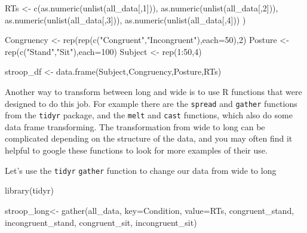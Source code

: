 \documentclass[
]{book}
\newenvironment{Shaded}{\begin{snugshade}}{\end{snugshade}}
\newcommand{\AttributeTok}[1]{\textcolor[rgb]{0.77,0.63,0.00}{#1}}
\newcommand{\DecValTok}[1]{\textcolor[rgb]{0.00,0.00,0.81}{#1}}
\newcommand{\FunctionTok}[1]{\textcolor[rgb]{0.00,0.00,0.00}{#1}}
\newcommand{\NormalTok}[1]{#1}
\newcommand{\OtherTok}[1]{\textcolor[rgb]{0.56,0.35,0.01}{#1}}
\newcommand{\SpecialCharTok}[1]{\textcolor[rgb]{0.00,0.00,0.00}{#1}}
\newcommand{\StringTok}[1]{\textcolor[rgb]{0.31,0.60,0.02}{#1}}
\begin{document}
\begin{Shaded}
\begin{Highlighting}[]
\NormalTok{RTs }\OtherTok{\textless{}{-}} \FunctionTok{c}\NormalTok{(}\FunctionTok{as.numeric}\NormalTok{(}\FunctionTok{unlist}\NormalTok{(all\_data[,}\DecValTok{1}\NormalTok{])),}
         \FunctionTok{as.numeric}\NormalTok{(}\FunctionTok{unlist}\NormalTok{(all\_data[,}\DecValTok{2}\NormalTok{])),}
         \FunctionTok{as.numeric}\NormalTok{(}\FunctionTok{unlist}\NormalTok{(all\_data[,}\DecValTok{3}\NormalTok{])),}
         \FunctionTok{as.numeric}\NormalTok{(}\FunctionTok{unlist}\NormalTok{(all\_data[,}\DecValTok{4}\NormalTok{]))}
\NormalTok{         )}

\NormalTok{Congruency }\OtherTok{\textless{}{-}} \FunctionTok{rep}\NormalTok{(}\FunctionTok{rep}\NormalTok{(}\FunctionTok{c}\NormalTok{(}\StringTok{"Congruent"}\NormalTok{,}\StringTok{"Incongruent"}\NormalTok{),}\AttributeTok{each=}\DecValTok{50}\NormalTok{),}\DecValTok{2}\NormalTok{)}
\NormalTok{Posture }\OtherTok{\textless{}{-}} \FunctionTok{rep}\NormalTok{(}\FunctionTok{c}\NormalTok{(}\StringTok{"Stand"}\NormalTok{,}\StringTok{"Sit"}\NormalTok{),}\AttributeTok{each=}\DecValTok{100}\NormalTok{)}
\NormalTok{Subject }\OtherTok{\textless{}{-}} \FunctionTok{rep}\NormalTok{(}\DecValTok{1}\SpecialCharTok{:}\DecValTok{50}\NormalTok{,}\DecValTok{4}\NormalTok{)}

\NormalTok{stroop\_df }\OtherTok{\textless{}{-}} \FunctionTok{data.frame}\NormalTok{(Subject,Congruency,Posture,RTs)}
\end{Highlighting}
\end{Shaded}

Another way to transform between long and wide is to use R functions that were designed to do this job. For example there are the \texttt{spread} and \texttt{gather} functions from the \texttt{tidyr} package, and the \texttt{melt} and \texttt{cast} functions, which also do some data frame transforming. The transformation from wide to long can be complicated depending on the structure of the data, and you may often find it helpful to google these functions to look for more examples of their use.

Let's use the \texttt{tidyr} \texttt{gather} function to change our data from wide to long

\begin{Shaded}
\begin{Highlighting}[]
\FunctionTok{library}\NormalTok{(tidyr)}

\NormalTok{stroop\_long}\OtherTok{\textless{}{-}} \FunctionTok{gather}\NormalTok{(all\_data, }\AttributeTok{key=}\NormalTok{Condition, }\AttributeTok{value=}\NormalTok{RTs, }
\NormalTok{                     congruent\_stand, incongruent\_stand,}
\NormalTok{                     congruent\_sit, incongruent\_sit)}
\end{Highlighting}
\end{Shaded}
\end{document}
